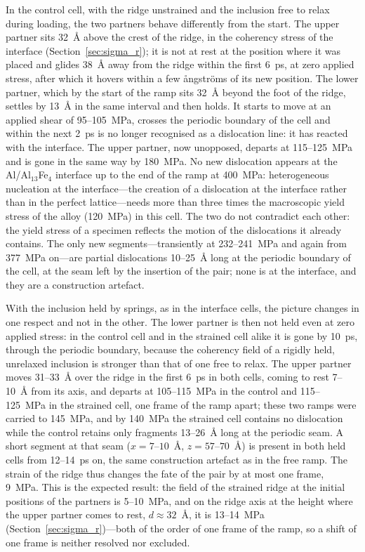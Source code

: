 In the control cell, with the ridge unstrained and the inclusion free to
relax during loading, the two partners behave differently from the start. The upper partner sits 32~\AA{} above the crest
of the ridge, in the coherency stress of the interface
(Section~\ref{sec:sigma_r}); it is not at rest at the position where it was
placed and glides 38~\AA{} away from the ridge within the first
6~ps, at zero applied stress, after which it hovers within a few {\aa}ngstr{\"o}ms
of its new position. The lower partner, which by the start of the ramp sits 32~\AA{} beyond the
foot of the ridge, settles by 13~\AA{} in the same interval and then holds. It
starts to move at an applied shear of 95--105~MPa, crosses the
periodic boundary of the cell and within the next 2~ps is no longer
recognised as a dislocation line: it has reacted with the interface. The
upper partner, now unopposed, departs at 115--125~MPa and is
gone in the same way by 180~MPa. No new dislocation appears at the Al/Al$_{13}$Fe$_4$ interface up to the end of the ramp at 400~MPa: heterogeneous nucleation at the interface---the creation of a dislocation at the interface rather than in the perfect lattice---needs more than three times the macroscopic yield stress of the alloy (120~MPa) in this cell. The two do not contradict each other: the yield stress of a specimen reflects the motion of the dislocations it already contains. The only new segments---transiently at 232--241~MPa and again from 377~MPa on---are partial dislocations 10--25~\AA{} long at the periodic boundary of the cell, at the seam left by the insertion of the pair; none is at the interface, and they are a construction artefact.

With the inclusion held by springs, as in the interface cells, the picture
changes in one respect and not in the other. The lower partner is then not
held even at zero applied stress: in the control cell and in the strained
cell alike it is gone by 10~ps, through the periodic boundary,
because the coherency field of a rigidly held, unrelaxed inclusion is
stronger than that of one free to relax. The upper partner moves 31--33~\AA{}
over the ridge in the first 6~ps in both cells, coming to rest 7--10~\AA{}
from its axis, and departs at 105--115~MPa in the control and 115--125~MPa in
the strained cell, one frame of the ramp apart; these two ramps were carried
to 145~MPa, and by 140~MPa the strained cell contains no dislocation while
the control retains only fragments 13--26~\AA{} long at the periodic seam.
A short segment at that seam ($x=7$--$10$~\AA{}, $z=57$--$70$~\AA{}) is
present in both held cells from 12--14~ps on, the same construction
artefact as in the free ramp. The strain of the ridge thus changes the fate
of the pair by at most one frame, 9~MPa. This is the expected result: the
field of the strained ridge at the initial positions of the partners is
5--10~MPa, and on the ridge axis at the height where the upper partner
comes to rest, $d\approx32$~\AA{}, it is 13--14~MPa
(Section~\ref{sec:sigma_r})---both of the order of one frame of the ramp,
so a shift of one frame is neither resolved nor excluded.

